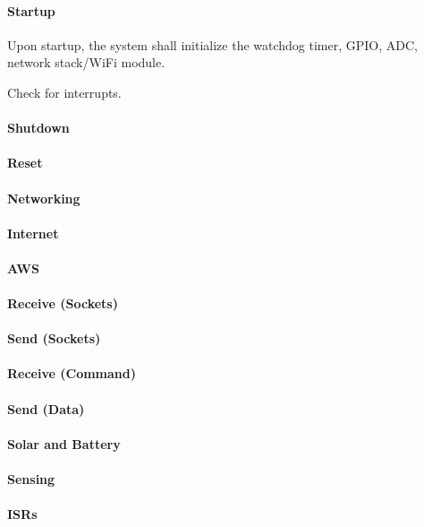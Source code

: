 \paragraph{Startup} Upon startup, the system shall initialize the watchdog
timer, GPIO, ADC, network stack/WiFi module.

Check for interrupts.



\paragraph{Shutdown}
\paragraph{Reset}
\paragraph{Networking}
\paragraph{Internet}
\paragraph{AWS}
\paragraph{Receive (Sockets)}
\paragraph{Send (Sockets)}
\paragraph{Receive (Command)}
\paragraph{Send (Data)}
\paragraph{Solar and Battery}
\paragraph{Sensing}
\paragraph{ISRs} %
